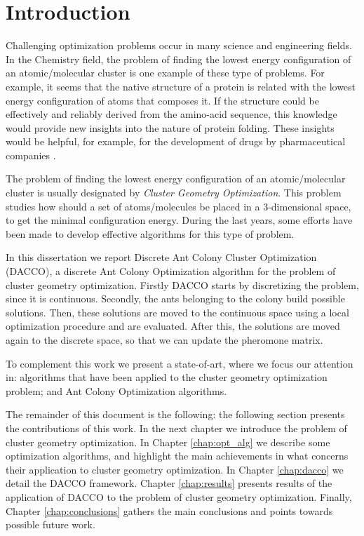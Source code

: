 \chapter{Introduction}

Challenging optimization problems occur in many science and engineering fields. In the Chemistry field, the problem of finding the lowest energy configuration of an atomic/molecular cluster is one example of these type of problems. For example, it seems that the native structure of a protein is related with the lowest energy configuration of atoms that composes it. If the structure could be effectively and reliably derived from the amino-acid sequence, this knowledge would provide new insights into the nature of protein folding. These insights would be helpful, for example, for the development of drugs by pharmaceutical companies \cite{wales97}.

The problem of finding the lowest energy configuration of an atomic/molecular cluster is usually designated by \emph{Cluster Geometry Optimization}. This problem studies how should a set of atoms/molecules be placed in a 3-dimensional space, to get the minimal configuration energy. During the last years, some efforts have been made to develop effective algorithms for this type of problem.

In this dissertation we report Discrete Ant Colony Cluster Optimization (DACCO), a discrete Ant Colony Optimization algorithm for the problem of cluster geometry optimization. Firstly DACCO starts by discretizing the problem, since it is continuous. Secondly, the ants belonging to the colony build possible solutions. Then, these solutions are moved to the continuous space using a local optimization procedure and are evaluated. After this, the solutions are moved again to the discrete space, so that we can update the pheromone matrix.

To complement this work we present a state-of-art, where we focus our attention in: algorithms that have been applied to the cluster geometry optimization problem; and Ant Colony Optimization algorithms.

The remainder of this document is the following: the following section presents the contributions of this work. In the next chapter we introduce the problem of cluster geometry optimization. In Chapter \ref{chap:opt_alg} we describe some optimization algorithms, and highlight the main achievements in what concerns their application to cluster geometry optimization. In Chapter \ref{chap:dacco} we detail the DACCO framework. Chapter \ref{chap:results} presents results of the application of DACCO to the problem of cluster geometry optimization. Finally, Chapter \ref{chap:conclusions} gathers the main conclusions and points towards possible future work.


